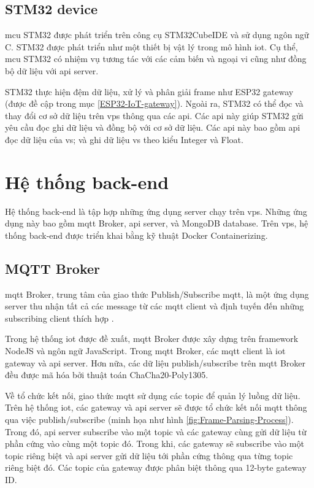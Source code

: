 \subsection{STM32 device}

\acrshort{mcu} STM32 được phát triển trên công cụ STM32CubeIDE và sử dụng ngôn ngữ C. STM32 được phát triển như một thiết bị vật lý trong mô hình \acrshort{iot}. Cụ thể, \acrshort{mcu} STM32 có nhiệm vụ tương tác với các cảm biến và ngoại vi cũng như đồng bộ dữ liệu với \acrshort{api} server.

STM32 thực hiện đệm dữ liệu, xử lý và phân giải frame như ESP32 gateway (được đề cập trong mục \ref{ESP32-IoT-gateway}). Ngoài ra, STM32 có thể đọc và thay đổi cơ sở dữ liệu trên \acrshort{vps} thông qua các \acrshort{api}. Các \acrshort{api} này giúp STM32 gửi yêu cầu đọc ghi dữ liệu và đồng bộ với cơ sở dữ liệu. Các \acrshort{api} này bao gồm \acrshort{api} đọc dữ liệu của \acrfull{vs}; và ghi dữ liệu \acrshort{vs} theo kiểu Integer và Float.

\section{Hệ thống back-end}

Hệ thống back-end là tập hợp những ứng dụng server chạy trên \acrshort{vps}. Những ứng dụng này bao gồm \acrshort{mqtt} Broker, \acrshort{api} server, và MongoDB database. Trên \acrshort{vps}, hệ thống back-end được triển khai bằng kỹ thuật Docker Containerizing.

\subsection{MQTT Broker}

\acrshort{mqtt} Broker, trung tâm của giao thức Publish/Subscribe \acrshort{mqtt}, là một ứng dụng server thu nhận tất cả các message từ các \acrshort{mqtt} client và định tuyến đến những subscribing client thích hợp \cite{MQTT-Broker-Def}.

Trong hệ thống \acrshort{iot} được đề xuất, \acrshort{mqtt} Broker được xây dựng trên framework NodeJS và ngôn ngữ JavaScript. Trong \acrshort{mqtt} Broker, các \acrshort{mqtt} client là \acrshort{iot} gateway và \acrshort{api} server. Hơn nữa, các dữ liệu publish/subscribe trên \acrshort{mqtt} Broker đều được mã hóa bởi thuật toán ChaCha20-Poly1305.

Về tổ chức kết nối, giao thức \acrshort{mqtt} sử dụng các topic để quản lý luồng dữ liệu. Trên hệ thống \acrshort{iot}, các gateway và \acrshort{api} server sẽ được tổ chức kết nối \acrshort{mqtt} thông qua việc publish/subscribe (minh họa như hình \ref{fig:Frame-Parsing-Process}). Trong đó, \acrshort{api} server subscribe vào một topic và các gateway cùng gửi dữ liệu từ phần cứng vào cùng một topic đó. Trong khi, các gateway sẽ subscribe vào một topic riêng biệt và \acrshort{api} server gửi dữ liệu tới phần cứng thông qua từng topic riêng biệt đó. Các topic của gateway được phân biệt thông qua 12-byte gateway ID.

